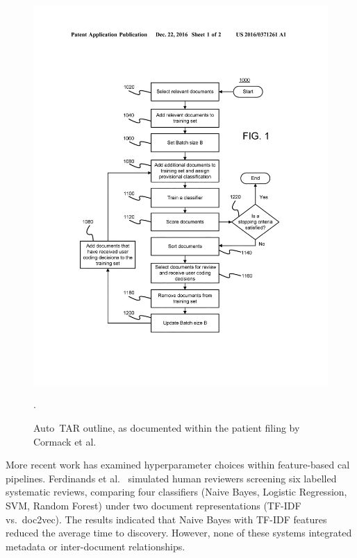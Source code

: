 \documentclass[10pt,oneside]{book}
\begin{document}
\begin{figure}
    \centering
    \includegraphics[width=1\linewidth]{images/autotar.jpg}
    \caption{Auto~TAR outline, as documented within the patient filing by Cormack et al. \cite{cormack_systems_2016}}.
    \label{fig:autotar_process}
\end{figure}

More recent work has examined hyperparameter choices within feature-based \gls*{cal} pipelines. Ferdinands et al.~\cite{ferdinands_performance_2023} simulated human reviewers screening six labelled systematic reviews, comparing four classifiers (Naive Bayes, Logistic Regression, SVM, Random Forest) under two document representations (TF-IDF vs.\ doc2vec). The results indicated that Naive Bayes with TF-IDF features reduced the average time to discovery. However, none of these systems integrated metadata or inter-document relationships.
\end{document}

